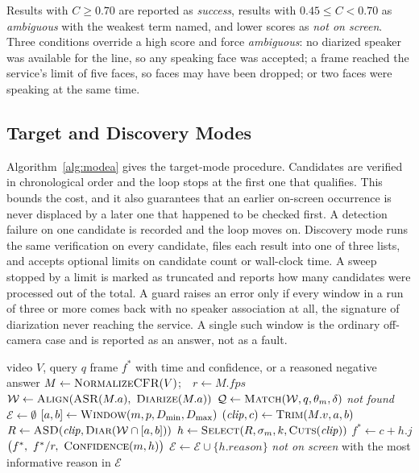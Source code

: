 \documentclass[conference]{IEEEtran}
\begin{document}
Results with $C\ge0.70$ are reported as \textit{success}, results with $0.45\le C<0.70$ as \textit{ambiguous} with the weakest term named, and lower scores as \textit{not on screen}. Three conditions override a high score and force \textit{ambiguous}: no diarized speaker was available for the line, so any speaking face was accepted; a frame reached the service's limit of five faces, so faces may have been dropped; or two faces were speaking at the same time.

\subsection{Target and Discovery Modes}
Algorithm~\ref{alg:modea} gives the target-mode procedure. Candidates are verified in chronological order and the loop stops at the first one that qualifies. This bounds the cost, and it also guarantees that an earlier on-screen occurrence is never displaced by a later one that happened to be checked first. A detection failure on one candidate is recorded and the loop moves on. Discovery mode runs the same verification on every candidate, files each result into one of three lists, and accepts optional limits on candidate count or wall-clock time. A sweep stopped by a limit is marked as truncated and reports how many candidates were processed out of the total. A guard raises an error only if every window in a run of three or more comes back with no speaker association at all, the signature of diarization never reaching the service. A single such window is the ordinary off-camera case and is reported as an answer, not as a fault.

\begin{algorithm}[t]
\caption{Target-mode localization}
\label{alg:modea}
\small
\begin{algorithmic}[1]
\Require video $V$, query $q$
\Ensure frame $f^\ast$ with time and confidence, or a reasoned negative answer
\State $M \gets \textsc{NormalizeCFR}(V)$;\ \ $r \gets M.\mathit{fps}$
\State $\mathcal{W} \gets \textsc{Align}(\textsc{ASR}(M.a),\ \textsc{Diarize}(M.a))$
\State $\mathcal{Q} \gets \textsc{Match}(\mathcal{W}, q, \theta_m, \delta)$ 
  \State \Return \textit{not found}
\EndIf
\State $\mathcal{E} \gets \emptyset$
  \State $[a,b] \gets \textsc{Window}(m, p, D_{\min}, D_{\max})$
  \State $(\mathit{clip}, c) \gets \textsc{Trim}(M.v, a, b)$
  \State $R \gets \textsc{ASD}(\mathit{clip}, \textsc{Diar}(\mathcal{W}\cap[a,b]))$
  \State $h \gets \textsc{Select}(R, \sigma_m, k, \textsc{Cuts}(\mathit{clip}))$
    \State $f^\ast \gets c + h.j$
    \State \Return $\bigl(f^\ast,\ f^\ast/r,\ \textsc{Confidence}(m,h)\bigr)$
  \EndIf
  \State $\mathcal{E} \gets \mathcal{E}\cup\{h.\mathit{reason}\}$
\EndFor
\State \Return \textit{not on screen} with the most informative reason in $\mathcal{E}$
\end{algorithmic}
\end{algorithm}
\end{document}
